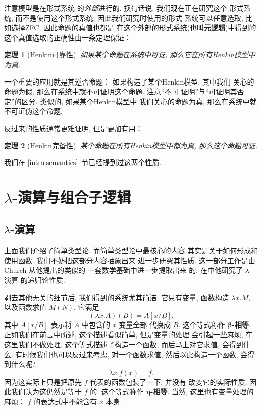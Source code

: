\documentclass[UTF8]{ctexbook}
\theoremstyle{plain}
\newtheorem{theorem}{定理}[chapter]
\theoremstyle{definition}
\theoremstyle{remark}
\begin{document}
注意模型是在形式系统
的\emph{外部}进行的. 换句话说, 我们现在正在研究这个
形式系统, 而不是使用这个形式系统; 因此我们研究时使用的形式
系统可以任意选取, 比如选择ZFC. 因此命题的真值也都是
在这个外部的形式系统(也叫\textbf{元逻辑})中得到的.
这个真值选取的正确性由一条定理保证：
\begin{theorem}[Henkin可靠性]
如果某个命题在系统中可证, 那么它在所有Henkin模型中为真.
\end{theorem}
一个重要的应用就是其逆否命题：
如果构造了某个Henkin模型, 其中我们
关心的命题为假, 那么在系统中就不可证明这个命题. 注意“不可
证明”与“可证明其否定”的区分. 类似的, 如果某个Henkin模型中
我们关心的命题为真, 那么在系统中就不可证伪这个命题.

反过来的性质通常更难证明, 但是更加有用：
\begin{theorem}[Henkin完备性]
某个命题在所有Henkin模型中都为真, 那么这个命题可证.
\end{theorem}
我们在 \ref{intro:semantics}~节已经提到过这两个性质.

\section{\texorpdfstring{\(\lambda\)}{Lambda}-演算与组合子逻辑}
\subsection{\texorpdfstring{\(\lambda\)}{Lambda}-演算}
上面我们介绍了简单类型论. 而简单类型论中最核心的内容
其实是关于如何形成和使用函数. 我们不妨把这部分内容抽象出来
进一步研究其性质. 这一部分工作是由 Church 从他提出的类似的
一套数学基础\cite{church:1932:untyped}中进一步提取出来
的; 在\cite{church:1936:lambda}中他研究了 \(\lambda\)-演算
的递归论性质.

剥去其他无关的细节后, 我们得到的系统尤其简洁. 它只有变量,
函数构造 \(\lambda x. M\), 以及函数求值 \(M(N)\).
它满足
\[(\lambda x. A)(B) = A[x/B].\]
其中 \(A[x/B]\) 表示将 \(A\) 中包含的 \(x\) 变量全部
代换成 \(B\). 这个等式称作 \textbf{\(\boldsymbol\beta\)-相等}.
正如我们在前言中所述, 这个描述看似简单, 但是变量的处理
会引起一些麻烦, 在这里我们不做处理. 这个等式描述了构造一个函数,
而后马上对它求值, 会得到什么. 有时候我们也可以反过来考虑,
对一个函数求值, 然后以此构造一个函数, 会得到什么呢?
\[\lambda x. f(x) = f.\]
因为这实际上只是把原先 \(f\) 代表的函数包装了一下, 并没有
改变它的实际性质, 因此我们认为这仍然是等于 \(f\) 的.
这个等式称作 \textbf{\(\boldsymbol\eta\)-相等}.
当然, 这里也有变量处理的麻烦： \(f\) 的表达式中不能含有 \(x\) 本身.
\end{document}

